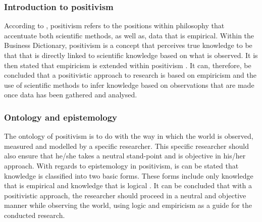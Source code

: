 \subsubsection{Introduction to positivism} 
According to \cite{Jakobsen2013}, positivism refers to the positions within philosophy that accentuate both scientific methods, as well as, data that is empirical. Within the Business Dictionary, positivism is a concept that perceives true knowledge to be that that is directly linked to scientific knowledge based on what is observed. It is then stated that empiricism is extended within positivism \citep{BusinessDictionary}. 
It can, therefore, be concluded that a positivistic approach to research is based on empiricism and the use of scientific methods to infer knowledge based on observations that are made once data has been gathered and analysed.
\subsubsection{Ontology and epistemology}
The ontology of positivism is to do with the way in which the world is observed, measured and modelled by a specific researcher. This specific researcher should also ensure that he/she takes a neutral stand-point and is objective in his/her approach. 
With regards to epistemology in positivism, is can be stated that knowledge is classified into two basic forms. These forms include only knowledge that is empirical and knowledge that is logical \citep{OatesJ2006}.
It can be concluded that with a positivistic approach, the researcher should proceed in a neutral and objective manner while observing the world, using logic and empiricism as a guide for the conducted research.
